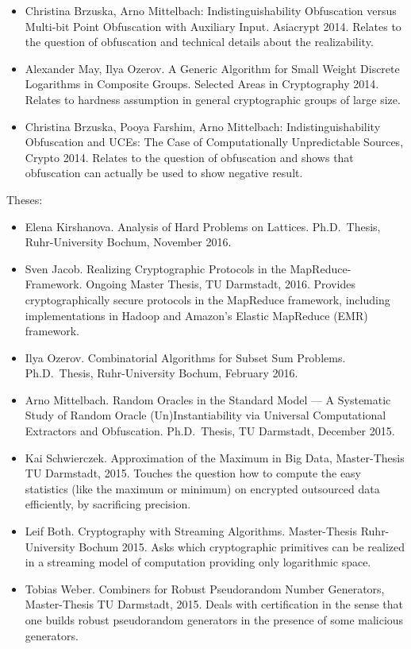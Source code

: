 \begin{itemize}
%
\item Christina Brzuska, Arno Mittelbach:
Indistinguishability Obfuscation versus Multi-bit Point Obfuscation with Auxiliary Input. Asiacrypt 2014. Relates to the question of obfuscation and technical details about the realizability.
%
\item Alexander May, Ilya Ozerov. A Generic Algorithm for Small Weight Discrete Logarithms in Composite Groups. Selected Areas in Cryptography 2014. Relates to hardness assumption in general cryptographic groups of large size.
%
\item 
Christina Brzuska, Pooya Farshim, Arno Mittelbach:
Indistinguishability Obfuscation and UCEs: The Case of Computationally Unpredictable Sources, Crypto 2014. Relates to the question of obfuscation and shows that obfuscation can actually be used to show negative result.
%
\end{itemize}
%
\vspace*{-0.3cm}
\noindent
Theses:
\vspace*{-0.3cm}
\begin{itemize}
\item Elena Kirshanova. Analysis of Hard Problems on Lattices. Ph.D.~Thesis, Ruhr-University Bochum, November 2016.
%
\item Sven Jacob. Realizing Cryptographic Protocols in the MapReduce-Framework. Ongoing Master Thesis, TU Darmstadt, 2016. Provides cryptographically secure protocols in the MapReduce framework, including implementations in Hadoop and Amazon's Elastic MapReduce (EMR) framework.
%
\item Ilya Ozerov. Combinatorial Algorithms for Subset Sum Problems. Ph.D.~Thesis, Ruhr-University Bochum, February 2016.
%
\item Arno Mittelbach. Random Oracles in the Standard Model --- A Systematic Study of Random Oracle (Un)Instantiability via Universal Computational Extractors and Obfuscation. Ph.D.~Thesis, TU Darmstadt, December 2015.
%
\item Kai Schwierczek. Approximation of the Maximum in Big Data, Master-Thesis TU Darmstadt, 2015. Touches the question how to compute the easy statistics (like the maximum or minimum) on encrypted outsourced data efficiently, by sacrificing precision.
%
\item Leif Both. Cryptography with Streaming Algorithms. Master-Thesis Ruhr-University Bochum 2015. Asks which cryptographic primitives can be realized in a streaming model of computation providing only logarithmic space.

%
\item Tobias Weber. Combiners for Robust Pseudorandom Number Generators, Master-Thesis TU Darmstadt, 2015. Deals with certification in the sense that one builds robust pseudorandom generators in the presence of some malicious generators.
%
\end{itemize}
